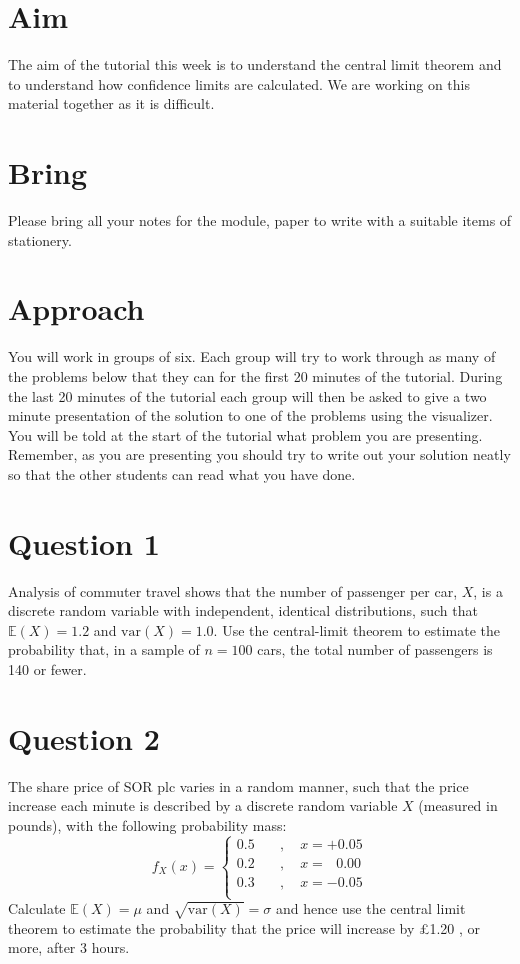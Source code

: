 \documentclass[a4paper]{article}
\begin{document}
\section{Aim}

The aim of the tutorial this week is to understand the central limit theorem and to understand how confidence limits are calculated.  We are working on this material together as it is difficult.

\section{Bring}

Please bring all your notes for the module, paper to write with a suitable items of stationery.

\section{Approach}

You will work in groups of six.  Each group will try to work through as many of the problems below that they can for the first 20 minutes of the tutorial.  During the last 20 minutes of the tutorial 
each group will then be asked to give a two minute presentation of the solution to one of the problems using the visualizer.  You will be told at the start of the tutorial what problem you are 
presenting.  Remember, as you are presenting you should try to write out your solution neatly so that the other students can read what you have done.

\section{Question 1}

Analysis of commuter travel  shows that the number of passenger per car, $X$,
is a discrete random variable with independent, identical distributions, such that
$\mathbb{E}(X)=1.2$ and $\textrm{var}(X) = 1.0$.  Use the central-limit theorem  to estimate
the probability that, in a sample of $n=100$ cars, the total number of passengers is 140 or fewer.


\section{Question 2}

The share price of SOR plc  varies in  a random manner, such that
the price increase each minute is described by a discrete
random variable  $X$ (measured in pounds), with the following probability mass:
$$
f_{X}(x) =
\left\{
\begin{array}{ll}
0.5   & \quad , \quad  x=+0.05  \\
0.2  & \quad , \quad x=\ \ \ 0.00  \\
0.3   & \quad , \quad  x=-0.05  \\
\end{array}
\right.
$$
Calculate $\mathbb{E}(X)=\mu$ and $\sqrt{\textrm{var}(X)}=\sigma$ and hence use the central limit
theorem to estimate the probability  that the price will increase by £1.20 , or more,  after 3  hours.
\end{document}
